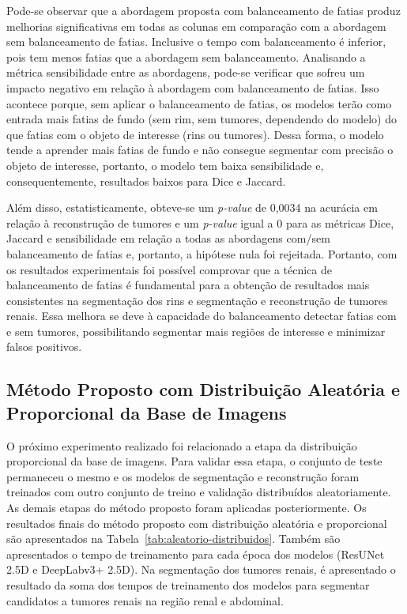 Pode-se observar que a abordagem proposta com balanceamento de fatias produz melhorias significativas em todas as colunas em comparação com a abordagem sem balanceamento de fatias. Inclusive o tempo com balanceamento é inferior, pois tem menos fatias que a abordagem sem balanceamento. Analisando a métrica sensibilidade entre as abordagens, pode-se verificar que sofreu um impacto negativo em relação à abordagem com balanceamento de fatias. Isso acontece porque, sem aplicar o balanceamento de fatias, os modelos terão como entrada mais fatias de fundo (sem rim, sem tumores, dependendo do modelo) do que fatias com o objeto de interesse (rins ou tumores). Dessa forma, o modelo tende a aprender mais fatias de fundo e não consegue segmentar com precisão o objeto de interesse, portanto, o modelo tem baixa sensibilidade e, consequentemente, resultados baixos para Dice e Jaccard.

Além disso, estatisticamente, obteve-se um \textit{p-value} de 0,0034 na acurácia em relação à reconstrução de tumores e um \textit{p-value} igual a 0 para as métricas Dice, Jaccard e sensibilidade em relação a todas as abordagens com/sem balanceamento de fatias e, portanto, a hipótese nula foi rejeitada. Portanto, com os resultados experimentais foi possível comprovar que a técnica de balanceamento de fatias é fundamental para a obtenção de resultados mais consistentes na segmentação dos rins e segmentação e reconstrução de tumores renais. Essa melhora se deve à capacidade do balanceamento detectar fatias com e sem tumores, possibilitando segmentar mais regiões de interesse e minimizar falsos positivos.


\subsection{Método Proposto com Distribuição Aleatória e Proporcional da Base de Imagens}
\label{sec:distribuicao-proporcional-grupos-tumores}

O próximo experimento realizado foi relacionado a etapa da distribuição proporcional da base de imagens. Para validar essa etapa, o conjunto de teste permaneceu o mesmo e os modelos de segmentação e reconstrução foram treinados com outro conjunto de treino e validação distribuídos aleatoriamente. As demais etapas do método proposto foram aplicadas posteriormente. Os resultados finais do método proposto com distribuição aleatória e proporcional são apresentados na Tabela~\ref{tab:aleatorio-distribuidos}. Também são apresentados o tempo de treinamento para cada época dos modelos (ResUNet 2.5D e DeepLabv3+ 2.5D). Na segmentação dos tumores renais, é apresentado o resultado da soma dos tempos de treinamento dos modelos para segmentar candidatos a tumores renais na região renal e abdominal.

